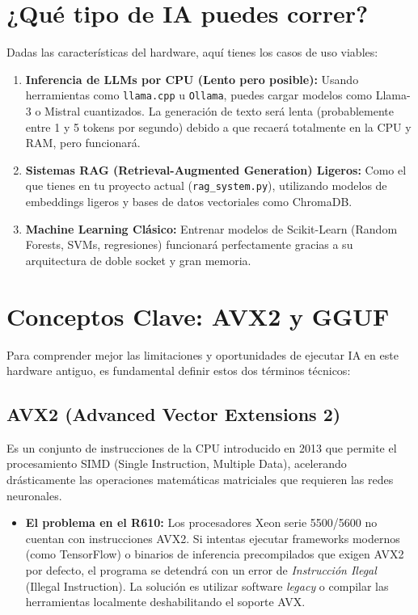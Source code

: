 \documentclass[12pt,a4paper]{article}
\begin{document}
\section{¿Qué tipo de IA puedes correr?}
Dadas las características del hardware, aquí tienes los casos de uso viables:
\begin{enumerate}
    \item \textbf{Inferencia de LLMs por CPU (Lento pero posible):} Usando herramientas como \texttt{llama.cpp} u \texttt{Ollama}, puedes cargar modelos como Llama-3 o Mistral cuantizados. La generación de texto será lenta (probablemente entre 1 y 5 tokens por segundo) debido a que recaerá totalmente en la CPU y RAM, pero funcionará.
    \item \textbf{Sistemas RAG (Retrieval-Augmented Generation) Ligeros:} Como el que tienes en tu proyecto actual (\texttt{rag\_system.py}), utilizando modelos de embeddings ligeros y bases de datos vectoriales como ChromaDB.
    \item \textbf{Machine Learning Clásico:} Entrenar modelos de Scikit-Learn (Random Forests, SVMs, regresiones) funcionará perfectamente gracias a su arquitectura de doble socket y gran memoria.
\end{enumerate}

\section{Conceptos Clave: AVX2 y GGUF}
Para comprender mejor las limitaciones y oportunidades de ejecutar IA en este hardware antiguo, es fundamental definir estos dos términos técnicos:

\subsection{AVX2 (Advanced Vector Extensions 2)}
Es un conjunto de instrucciones de la CPU introducido en 2013 que permite el procesamiento SIMD (Single Instruction, Multiple Data), acelerando drásticamente las operaciones matemáticas matriciales que requieren las redes neuronales.
\begin{itemize}
    \item \textbf{El problema en el R610:} Los procesadores Xeon serie 5500/5600 no cuentan con instrucciones AVX2. Si intentas ejecutar frameworks modernos (como TensorFlow) o binarios de inferencia precompilados que exigen AVX2 por defecto, el programa se detendrá con un error de \textit{Instrucción Ilegal} (Illegal Instruction). La solución es utilizar software \textit{legacy} o compilar las herramientas localmente deshabilitando el soporte AVX.
\end{itemize}
\end{document}
